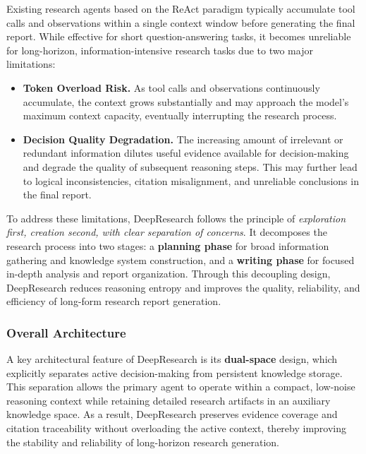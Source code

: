 \documentclass{huawei}
\begin{document}
Existing research agents based on the ReAct paradigm typically accumulate tool calls and observations within a single context window before generating the final report.  While effective for short question-answering tasks, it becomes unreliable for long-horizon, information-intensive research tasks due to two major limitations:
\begin{itemize}[leftmargin=1em, listparindent=\parindent]
    \item \textbf{Token Overload Risk.} As tool calls and observations continuously accumulate, the context grows substantially and may approach the model's maximum context capacity, eventually interrupting the research process.
    \item \textbf{Decision Quality Degradation.} The increasing amount of irrelevant or redundant information dilutes useful evidence available for decision-making and degrade the quality of subsequent reasoning steps. This may further lead to  logical inconsistencies, citation misalignment, and unreliable conclusions in the final report.
\end{itemize}
To address these limitations, DeepResearch follows the principle of \textit{exploration first, creation second, with clear separation of concerns}. It decomposes the research process into two stages: a \textbf{planning phase} for broad information gathering and knowledge system construction, and a \textbf{writing phase} for focused in-depth analysis and report organization. Through this decoupling design, DeepResearch reduces reasoning entropy and improves the quality, reliability, and efficiency of long-form research report generation.



\subsubsection{Overall Architecture}

A key architectural feature of DeepResearch is its \textbf{dual-space} design, which explicitly separates active decision-making from persistent knowledge storage. This separation allows the primary agent to operate within a compact, low-noise reasoning context while retaining detailed research artifacts in an auxiliary knowledge space. As a result, DeepResearch preserves evidence coverage and citation traceability without overloading the active context, thereby improving the stability and reliability of long-horizon research generation.%
\end{document}
